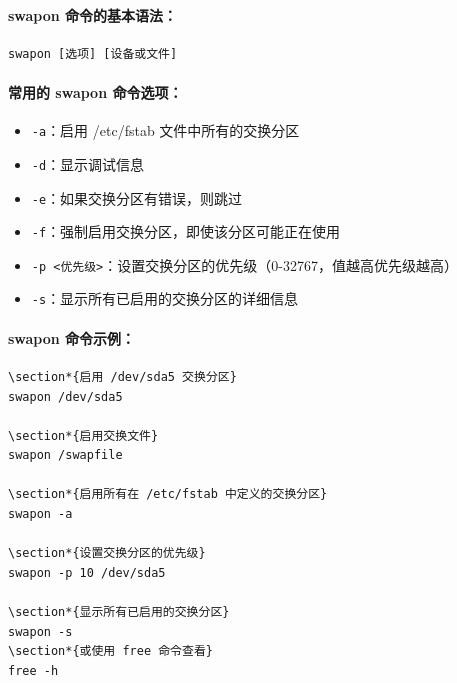 \documentclass[12pt,UTF8]{ctexbook}
\begin{document}
\paragraph{swapon 命令的基本语法：}
\begin{verbatim}
swapon [选项] [设备或文件]
\end{verbatim}

\paragraph{常用的 swapon 命令选项：}
\begin{itemize}
    \item \verb+-a+：启用 /etc/fstab 文件中所有的交换分区
    \item \verb+-d+：显示调试信息
    \item \verb+-e+：如果交换分区有错误，则跳过
    \item \verb+-f+：强制启用交换分区，即使该分区可能正在使用
    \item \verb+-p <优先级>+：设置交换分区的优先级（0-32767，值越高优先级越高）
    \item \verb+-s+：显示所有已启用的交换分区的详细信息
\end{itemize}

\paragraph{swapon 命令示例：}
\begin{verbatim}
\section*{启用 /dev/sda5 交换分区}
swapon /dev/sda5

\section*{启用交换文件}
swapon /swapfile

\section*{启用所有在 /etc/fstab 中定义的交换分区}
swapon -a

\section*{设置交换分区的优先级}
swapon -p 10 /dev/sda5

\section*{显示所有已启用的交换分区}
swapon -s
\section*{或使用 free 命令查看}
free -h
\end{verbatim}
\end{document}
